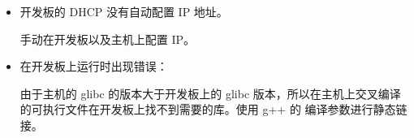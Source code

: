 \begin{itemize}
    \item 开发板的 DHCP 没有自动配置 IP 地址。
    
    手动在开发板以及主机上配置 IP。

    \item 在开发板上运行时出现错误：
    
    
    由于主机的 glibc 的版本大于开发板上的 glibc 版本，所以在主机上交叉编译的可执行文件在开发板上找不到需要的库。使用 g++ 的  编译参数进行静态链接。
\end{itemize}